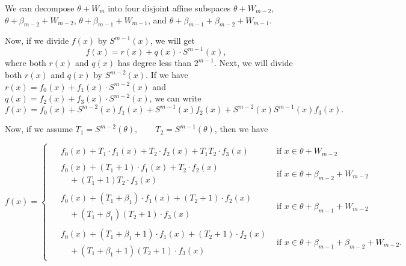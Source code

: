 \documentclass[11pt,runningheads]{llncs}
\begin{document}
\noindent We can decompose $\theta+W_m$ into four disjoint affine subspaces $\theta+W_{m-2}$, $\theta+\beta_{m-2}+ W_{m-2}$, $\theta+\beta_{m-1}+ W_{m-1}$, and $\theta+\beta_{m-1}+\beta_{m-2}+ W_{m-1}$.

Now, if we divide $f(x)$ by $S^{m-1}(x)$, we will get
\[f(x) = r(x) + q(x) \cdot S^{m-1}(x), \]
where both $r(x)$ and $q(x)$ has degree less than $2^{m-1}$. Next, we will divide both $r(x)$ and $q(x)$ by $S^{m-2}(x)$. If we have $r(x) = f_0(x) + f_1(x) \cdot S^{m-2}(x)$ and $q(x) = f_2(x) + f_3(x) \cdot S^{m-2}(x)$, we can write
\[ f(x)= f_0(x)+ S^{m-2}(x)f_1(x)+  S^{m-1}(x)f_2(x)+ S^{m-2}(x)S^{m-1}(x)f_3(x). \]

Now, if we assume $T_1 = S^{m-2}(\theta), \qquad T_2 = S^{m-1}(\theta)$, then we have

\begin{equation*}
    f(x) =
    \begin{cases}
        \begin{aligned}
            &f_0(x) + T_1\cdot f_1(x) + T_2 \cdot f_2(x) + T_1T_2 \cdot f_3(x)
        \end{aligned} & \text{if } x \in \theta+W_{m-2} \\[3ex]
        \begin{aligned}
            &f_0(x) + (T_1+1)\cdot f_1(x) + T_2 \cdot f_2(x) \\[-0.5ex]
            &\quad + (T_1+1)T_2 \cdot f_3(x)
        \end{aligned} & \text{if } x \in \theta+\beta_{m-2}+W_{m-2} \\[3ex]
        \begin{aligned}
            &f_0(x) + (T_1+\beta_1)\cdot f_1(x) + (T_2+1) \cdot f_2(x) \\[-0.5ex]
            &\quad + (T_1+\beta_1)(T_2+1) \cdot f_3(x)
        \end{aligned} & \text{if } x \in \theta+\beta_{m-1}+W_{m-2} \\[3ex]
        \begin{aligned}
            &f_0(x) + (T_1+\beta_1+1) \cdot f_1(x) + (T_2+1)\cdot f_2(x) \\[-0.5ex]
            &\quad + (T_1+\beta_1+1)(T_2+1) \cdot f_3(x)
        \end{aligned} & \text{if } x \in \theta+\beta_{m-1}+\beta_{m-2}+W_{m-2}.
    \end{cases}
\end{equation*}
\end{document}
